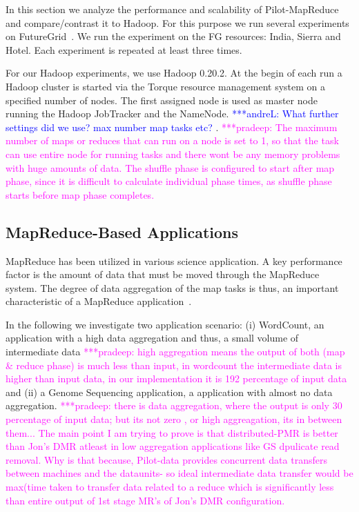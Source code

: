 \documentclass{acm_proc_article-sp}
\newcommand{\alnote}[1]{ {\textcolor{blue} { ***andreL: #1 }}}
\newcommand{\pnote}[1]{ {\textcolor{magenta} { ***pradeep: #1 }}}
\newcommand{\alnote}[1]{}
\newcommand{\pnote}[1]{}
\newcommand{\pilotmapreduce}{Pilot-MapReduce\xspace}
\begin{document}
In this section we analyze the performance and scalability of \pilotmapreduce
and compare/contrast it to Hadoop. For this purpose we run several experiments
on FutureGrid~\cite{fg}. We run the experiment on the FG resources: India, 
Sierra and Hotel. Each experiment is repeated at least three times.

For our Hadoop experiments, we use Hadoop 0.20.2. At the begin of each run a 
Hadoop cluster is started via the Torque resource management system on a
specified number of nodes. The first assigned node is used as master node
running the Hadoop JobTracker and the NameNode. \alnote{What further settings
did we use? max number map tasks etc?}. \pnote{The maximum number of maps or reduces that can run on a node is set to 1, so that the task can use entire node for running tasks and there wont be any memory problems with huge amounts of data. The shuffle phase is configured to start after map phase, since it is difficult to calculate individual phase times, as shuffle phase starts before map phase completes.}


\subsection{MapReduce-Based Applications}

MapReduce has been utilized in various science application. A key performance 
factor is the amount of data that must be moved through the MapReduce system. 
The degree of data aggregation of the map tasks is thus, an important 
characteristic of a MapReduce application~\cite{weissman-mr-11}.

In the following we investigate two application scenario: (i) WordCount, an
application with a high data aggregation and thus, a small volume of
intermediate data \pnote{ high aggregation means the output of both (map \& reduce phase) is much less than input, in wordcount the intermediate data is higher than input data, in our implementation it is 192 percentage of input data} and (ii) a Genome Sequencing application, a application with
almost no data aggregation.\pnote { there is data aggregation, where the output is only 30 percentage of input data; but its not zero , or high aggreagation, its in between them... The main point I am trying to prove  is that distributed-PMR is better than Jon's DMR atleast in low aggregation applications like GS dpulicate read removal.
Why is that because, Pilot-data provides concurrent data transfers between machines and the dataunits- so ideal intermediate data transfer would be { max(time taken to transfer data related to a reduce} which is significantly less than entire output of 1st stage MR's of Jon's DMR configuration.}
\end{document}
